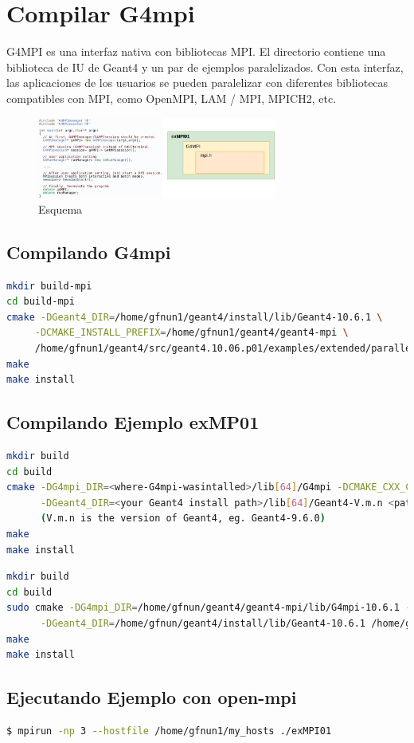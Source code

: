 \section{Compilar G4mpi}

G4MPI es una interfaz nativa con bibliotecas MPI. El directorio contiene una biblioteca de IU de Geant4 y un par de ejemplos paralelizados. Con esta interfaz, las aplicaciones de los usuarios se pueden paralelizar con diferentes bibliotecas compatibles con MPI, como OpenMPI, LAM / MPI, MPICH2, etc.

\begin{figure}[H]
    \centering
  \includegraphics[width=0.7\textwidth]{images/estructure.jpg}
  \caption{Esquema}
  \label{esq}
\end{figure}

\subsection{Compilando G4mpi}


\begin{lstlisting}[language=bash,style=mystyle]   
mkdir build-mpi
cd build-mpi
cmake -DGeant4_DIR=/home/gfnun1/geant4/install/lib/Geant4-10.6.1 \
     -DCMAKE_INSTALL_PREFIX=/home/gfnun1/geant4/geant4-mpi \
     /home/gfnun1/geant4/src/geant4.10.06.p01/examples/extended/parallel/MPI/source
make
make install  
\end{lstlisting}


\subsection{Compilando Ejemplo exMP01}

\begin{lstlisting}[language=bash,style=mystyle]   
mkdir build
cd build
cmake -DG4mpi_DIR=<where-G4mpi-wasintalled>/lib[64]/G4mpi -DCMAKE_CXX_COMPILER=mpicxx \
      -DGeant4_DIR=<your Geant4 install path>/lib[64]/Geant4-V.m.n <path-to-source>
      (V.m.n is the version of Geant4, eg. Geant4-9.6.0)
make
make install
\end{lstlisting}

\begin{lstlisting}[language=bash,style=mystyle]
mkdir build
cd build
sudo cmake -DG4mpi_DIR=/home/gfnun/geant4/geant4-mpi/lib/G4mpi-10.6.1 -DCMAKE_CXX_COMPILER=mpicxx \
      -DGeant4_DIR=/home/gfnun/geant4/install/lib/Geant4-10.6.1 /home/gfnun1/geant4/src/geant4.10.06.p01/examples/extended/parallel/MPI/examples/exMPI01
make
make install 
\end{lstlisting}

\subsection{Ejecutando Ejemplo con open-mpi}

\begin{lstlisting}[language=bash,style=mystyle]
$ mpirun -np 3 --hostfile /home/gfnun1/my_hosts ./exMPI01
\end{lstlisting}

\newpage


